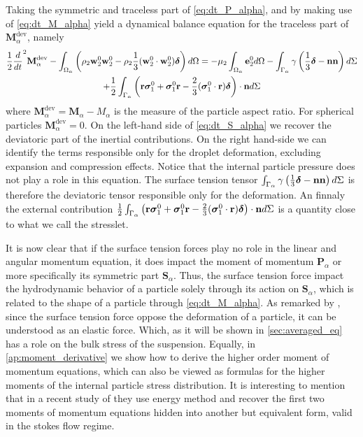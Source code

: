 Taking the symmetric and traceless part of \ref{eq:dt_P_alpha}, and by making use of \ref{eq:dt_M_alpha} yield a dynamical balance equation for the traceless part of $\textbf{M}_\alpha^\text{dev}$, namely
\begin{multline}    
    \frac{1}{2}\frac{d}{d t}^2{\textbf{M}_\alpha^\text{dev}}
    - \int_{\Omega_\alpha} \left(
        \rho_2\textbf{w}_2^0 \textbf{w}_2^0
        - \rho_2\frac{1}{3}(\textbf{w}_2^0 \cdot \textbf{w}_2^0)\bm\delta\right) d\Omega
    =  
        - \mu_2 \int_{\Omega_\alpha} \textbf{e}_2^0 d\Omega
        - \int_{\Gamma_\alpha} \gamma\left(\frac{1}{3}\bm\delta-\textbf{nn}\right) d\Sigma\\
        + \frac{1}{2}\int_{\Gamma_\alpha} \left(\textbf{r}\bm\sigma_1^0+ \bm\sigma_1^0\textbf{r} - \frac{2}{3}(\bm\sigma_1^0\cdot \textbf{r})\bm\delta\right)\cdot \textbf{n} d\Sigma
    \label{eq:dt_S_alpha}
\end{multline}
where $\textbf{M}^\text{dev}_\alpha = \textbf{M}_\alpha - M_\alpha$ is the measure of the particle aspect ratio. 
For spherical particles $\textbf{M}^\text{dev}_\alpha = 0$.
On the left-hand side of \ref{eq:dt_S_alpha} we recover the deviatoric part of the inertial contributions. 
On the right hand-side we can identify the terms responsible only for the droplet deformation, excluding expansion and compression effects.
Notice that the internal particle pressure does not play a role in this equation.  
The surface tension tensor $\int_{\Gamma_\alpha} \gamma\left(\frac{1}{3}\bm\delta-\textbf{nn}\right) d\Sigma$ is therefore the deviatoric tensor responsible only for the deformation. 
An finnaly the external contribution $\frac{1}{2}\int_{\Gamma_\alpha} \left(\textbf{r}\bm\sigma_1^0+ \bm\sigma_1^0\textbf{r} - \frac{2}{3}(\bm\sigma_1^0\cdot \textbf{r})\bm\delta\right)\cdot \textbf{n} d\Sigma$ is a quantity close to what we call the stresslet. 

It is now clear that if the surface tension forces play no role in the linear and angular momentum equation, it does impact the moment of momentum $\textbf{P}_\alpha$ or more specifically its symmetric part $\textbf{S}_\alpha$.
Thus, the surface tension force impact the hydrodynamic behavior of a particle solely through its action on $\textbf{S}_\alpha$, which is related to the shape of a particle through \ref{eq:dt_M_alpha}.
As remarked by \citet{batchelor1970stress}, since the surface tension force oppose the deformation of a particle, it can be understood as an elastic force. 
Which, as it will be shown in \ref{sec:averaged_eq} has a role on the bulk stress of the suspension. 
Equally, in \ref{ap:moment_derivative} we show how to derive the higher order moment of momentum equations, which can also be viewed as formulas for the higher moments of the internal particle stress distribution. 
It is interesting to mention that in a recent study of \citet{dolata2021faxen} they use energy method and recover the first two moments of momentum equations hidden into another but equivalent form, valid in the stokes flow regime. 



